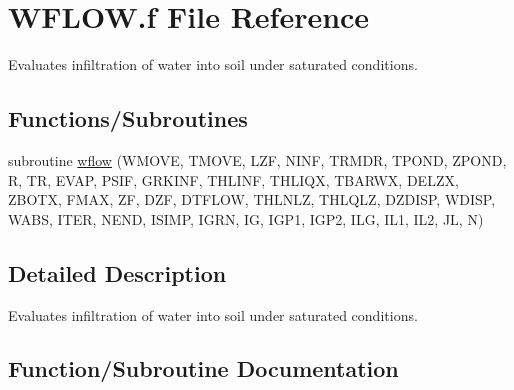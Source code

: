 \hypertarget{WFLOW_8f}{}\section{W\+F\+L\+O\+W.\+f File Reference}
\label{WFLOW_8f}


Evaluates infiltration of water into soil under saturated conditions.  


\subsection*{Functions/\+Subroutines}
\begin{DoxyCompactItemize}
\item 
subroutine \hyperlink{WFLOW_8f_a7a3409d93e2e44adae8e38e9ddd99f97}{wflow} (W\+M\+O\+V\+E, T\+M\+O\+V\+E, L\+Z\+F, N\+I\+N\+F, T\+R\+M\+D\+R, T\+P\+O\+N\+D, Z\+P\+O\+N\+D, R, T\+R, E\+V\+A\+P, P\+S\+I\+F, G\+R\+K\+I\+N\+F, T\+H\+L\+I\+N\+F, T\+H\+L\+I\+Q\+X, T\+B\+A\+R\+W\+X, D\+E\+L\+Z\+X, Z\+B\+O\+T\+X, F\+M\+A\+X, Z\+F, D\+Z\+F, D\+T\+F\+L\+O\+W, T\+H\+L\+N\+L\+Z, T\+H\+L\+Q\+L\+Z, D\+Z\+D\+I\+S\+P, W\+D\+I\+S\+P, W\+A\+B\+S, I\+T\+E\+R, N\+E\+N\+D, I\+S\+I\+M\+P, I\+G\+R\+N, I\+G, I\+G\+P1, I\+G\+P2, I\+L\+G, I\+L1, I\+L2, J\+L, N)
\end{DoxyCompactItemize}


\subsection{Detailed Description}
Evaluates infiltration of water into soil under saturated conditions. 



\subsection{Function/\+Subroutine Documentation}
\hypertarget{WFLOW_8f_a7a3409d93e2e44adae8e38e9ddd99f97}{}
